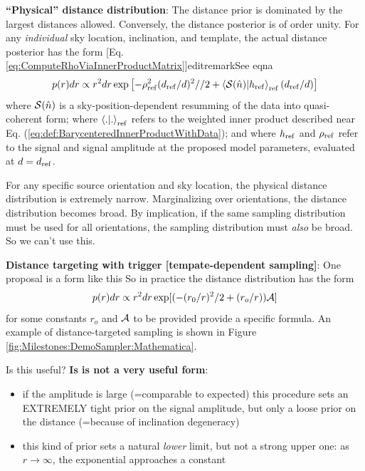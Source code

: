 \documentclass[twocolumn,prd,nofootinbib]{revtex4}
\newcommand\editremark[1]{{\color{red} #1}}
\newcommand\qmstateproduct[2]{\left\langle#1|#2\right\rangle}
\begin{document}
\begin{widetext}
\noindent \textbf{``Physical'' distance distribution}: The distance prior is dominated by the largest distances allowed.  Conversely,
the distance posterior is of order unity.
%
For any \emph{individual} sky location, inclination,  and template, the actual distance posterior has the form [Eq. \ref{eq:ComputeRhoViaInnerProductMatrix}]editremark{See eqna}
\begin{eqnarray}
p(r)dr \propto  r^2 dr \exp \left[ -\rho_{\rm ref}^2 (d_{\rm ref}/d)^2//2 + \qmstateproduct{{\cal S}(\hat{n})}{h_{\rm
      ref}}_{\rm ref} (d_{\rm
    ref}/d) \right]
\end{eqnarray}
where ${\cal S}(\hat{n})$ is a sky-position-dependent resumming of the data into quasi-coherent form; where
$\qmstateproduct{.}{.}_{\rm ref}$ refers to the weighted inner product described near
Eq. (\ref{eq:def:BarycenteredInnerProductWithData}); and where $h_{\rm ref}$ and $\rho_{\rm ref}$ refer to the signal
and signal amplitude at the proposed model parameters, evaluated at $d=d_{\rm ref}$.  
%

For any specific source orientation and sky location, the physical distance distribution is extremely narrow.
Marginalizing over orientations, the distance distribution becomes broad.  By implication, if the
same sampling distribution must be used for all orientations, the sampling distribution must \emph{also} be broad.  So
we can't use this.


\begin{shaded}
\noindent \textbf{Distance targeting with trigger [tempate-dependent sampling]}:  One proposal is a form like this
So in practice the distance distribution has the form
\begin{eqnarray}
p(r)dr \propto r^2 dr \exp[ (-(r_0/r)^2/2 + (r_o/r)){\cal A}]
\end{eqnarray}
for some constants $r_o$ and ${\cal A}$ to be provided \editremark{provide a specific formula}.  An example of distance-targeted sampling is shown in Figure
\ref{fig:Milestones:DemoSampler:Mathematica}.  

Is this useful?  \textbf{Is is not a very useful form}:
\begin{itemize}
\item  if the amplitude is large (=comparable to expected) this procedure sets an EXTREMELY tight prior on the signal amplitude, but
only a loose prior on the distance (=because of inclination degeneracy)

\item this kind of prior sets a natural \emph{lower} limit, but not a strong upper one: as $r \rightarrow \infty$, the
  exponential approaches a constant
\end{itemize}


\end{shaded}
\end{widetext}
\end{document}
